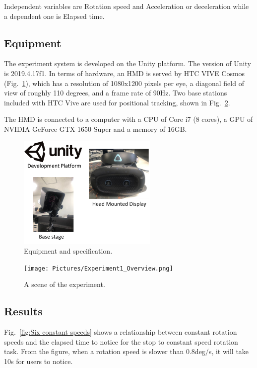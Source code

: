 Independent variables are Rotation speed and Acceleration or deceleration while a dependent one is Elapsed time.
\newpage
\subsection{Equipment}
The experiment system is developed on the Unity platform. The version of Unity is 2019.4.17f1. In terms of hardware, an HMD is served by HTC VIVE Cosmos (Fig.~\ref{fig:EquipmentAndSpecification}), which has a resolution of 1080x1200 pixels per eye, a diagonal field of view of roughly 110 degrees, and a frame rate of 90Hz. Two base stations included with HTC Vive are used for positional tracking, shown in Fig.~\ref{fig:Equipment1_AndSpecification}.

The HMD is connected to a computer with a CPU of Core i7 (8 cores), a GPU of NVIDIA GeForce GTX 1650 Super and a memory of 16GB.
\begin{figure}[H]\centering
	\includegraphics[width=0.6\textwidth]{Pictures/EquipmentAndSpecification.png}%
	\caption{Equipment and specification.}\label{fig:EquipmentAndSpecification}%
\end{figure}
\begin{figure}[H]\centering
	\texttt{[image: Pictures/Experiment1\_Overview.png]}%
	\caption{A scene of the experiment.}\label{fig:Equipment1_AndSpecification}%
\end{figure}
\newpage
\subsection{Results}
Fig.~\ref{fig:Six constant speeds} shows a relationship between constant rotation speeds and the elapsed time to notice for the stop to constant speed rotation task. From the figure, when a rotation speed is slower than 0.8deg/s, it will take 10s for users to notice.

